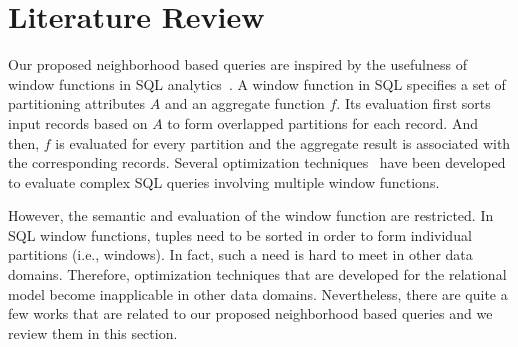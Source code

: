 \chapter{Literature Review}
Our proposed neighborhood based queries are inspired
by the usefulness of window functions in SQL analytics~\cite{zemke2012s}.
A window function in SQL specifies a set of partitioning attributes 
$A$ and an aggregate function $f$.
Its evaluation first sorts input records based on $A$ to form
overlapped partitions for each record. And then, $f$
is evaluated for every partition and the aggregate result is associated
with the corresponding records.
Several optimization techniques~\cite{bellamkonda2013adaptive,cao2012optimization }
have been developed to evaluate complex SQL queries 
involving multiple window functions.

However, the semantic and evaluation of the window function are restricted.
 In SQL window functions, tuples need to be sorted in order to form individual partitions (i.e., windows).
In fact, such a need is hard to meet in other data domains. Therefore, optimization techniques
that are developed for the relational model become inapplicable in other data domains. 
Nevertheless, there are quite a few works that are related to our proposed neighborhood based
queries and we review them in this section. 





